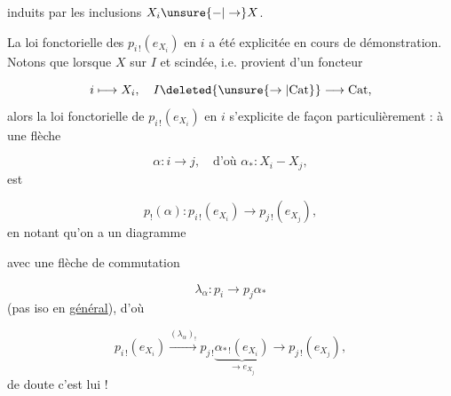 induits par les inclusions $X_i\unsure{-|\to}X$.

La loi fonctorielle des $p_{i\,!}(e_{X_i})$ en $i$ a été explicitée en cours de démonstration. Notons que lorsque $X$ sur $I$  et scindée, i.e. provient d'un foncteur

\[
i\longmapsto X_i,\quad I\deleted{\unsure{\to|\mathrm{Cat}}}\longrightarrow\mathrm{Cat},
\]
alors la loi fonctorielle de $p_{i\,!}(e_{X_i})$ en $i$ s'explicite de façon particulièrement  : à une flèche

\[
\alpha:i\to j,\quad\text{d'où }\alpha_*:X_i-X_j,
\]
est 

\[
p_!(\alpha):p_{i\,!}(e_{X_i})\longrightarrow p_{j\,!}(e_{X_j}),
\]
en notant qu'on a un diagramme

avec une flèche de commutation

\[
\lambda_\alpha:p_i\longrightarrow p_j\alpha_*
\]
(pas iso en \uline{général}), d'où

\[
p_{i\,!}(e_{X_i})\xrightarrow{(\lambda_\alpha)_!}
p_{j\,!}\underbrace{\alpha_{*\,!}(e_{X_i})}_{\longrightarrow e_{X_j}}
\longrightarrow p_{j\,!}(e_{X_j}),
\]
 de doute c'est lui ! 

